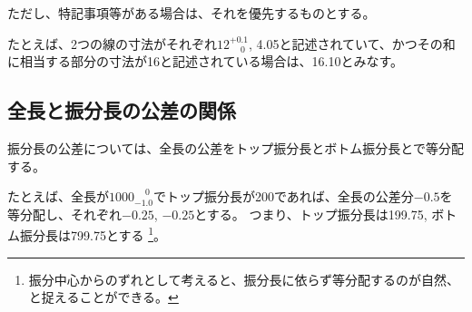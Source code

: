 ただし、特記事項等がある場合は、それを優先するものとする。
\begin{hosoku}
たとえば、2つの線の寸法がそれぞれ$12^{+0.1}_{\phantom -0}$, 4.05と記述されていて、かつその和に相当する部分の寸法が16と記述されている場合は、16.10とみなす。
\end{hosoku}



\clearpage


\subsection{全長と振分長の公差の関係}
振分長の公差については、全長の公差をトップ振分長とボトム振分長とで等分配する。
\begin{hosoku}
たとえば、全長が$1000^{\phantom +0}_{-1.0}$でトップ振分長が200であれば、全長の公差分$-0.5$を等分配し、それぞれ$-0.25$, $-0.25$とする。
つまり、トップ振分長は199.75, ボトム振分長は799.75とする
\footnote{振分中心からのずれとして考えると、振分長に依らず等分配するのが自然、と捉えることができる。}。
\end{hosoku}


